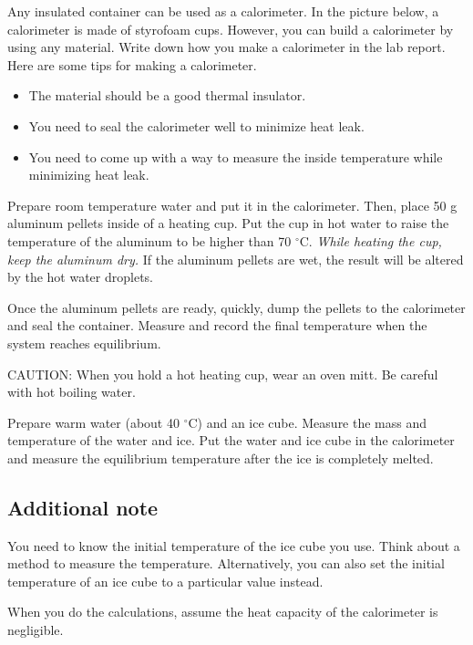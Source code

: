\observations 

Any insulated container can be used as a calorimeter. In the picture below, a calorimeter is made of styrofoam cups.  However, you can build a calorimeter by using any material. Write down how you make a calorimeter in the lab report. Here are some tips for making a calorimeter. 

\begin{itemize}
\item The material should be a good thermal insulator.
\item You need to seal the calorimeter well to minimize heat leak. 
\item You need to come up with a way to measure the inside temperature while minimizing heat leak. 
\end{itemize}



Prepare room temperature water and put it in the calorimeter. Then, place 50 g aluminum pellets inside of a heating cup. Put the cup in hot water to raise the temperature of the aluminum to be higher than 70 $^\circ$C. \textit{While heating the cup, keep the aluminum dry.} If the aluminum pellets are wet, the result will be altered by the hot water droplets. 

Once the aluminum pellets are ready, quickly, dump the pellets to the calorimeter and seal the container. Measure and record the final temperature when the system reaches equilibrium. 

CAUTION: When you hold a hot heating cup, wear an oven mitt. Be careful with hot boiling water. 

Prepare warm water (about 40 $^\circ$C) and an ice cube. Measure the mass and temperature of the water and ice. Put the water and ice cube in the calorimeter and measure the equilibrium temperature after the ice is completely melted.  

\subsection*{Additional note}
You need to know the initial temperature of the ice cube you use. Think about a method to measure the temperature. Alternatively, you can also set the initial temperature of an ice cube to a particular value instead.  


\analysis
When you do the calculations, assume the heat capacity of the calorimeter is negligible. 
